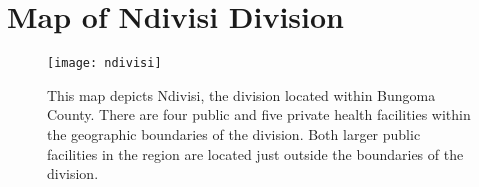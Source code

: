 \chapter{Map of Ndivisi Division}

\begin{figure}[htp]
\begin{center}
\texttt{[image: ndivisi]}
\end{center}
\caption[Map of Ndivisi Division.]{This map depicts Ndivisi, the division located within Bungoma County. There are four public and five private health facilities within the geographic boundaries of the division. Both larger public facilities in the region are located just outside the boundaries of the division.}
\label{fig:example}
\end{figure}
